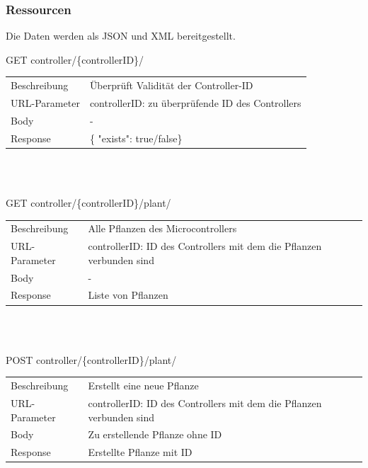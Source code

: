         \subsubsection{Ressourcen}
        Die Daten werden als JSON und XML bereitgestellt.\\
        
        \newcommand{\tabitem}{~~\llap{\textbullet}~~}
     \begin{minipage}{\textwidth}
             GET controller/\{controllerID\}/ 
        
          \begin{tabularx}{\textwidth}{lX}
                \toprule Beschreibung & Überprüft Validität der Controller-ID \\
                URL-Parameter & controllerID: zu überprüfende ID des Controllers \\
                Body & - \\
                Response & \{ "exists": true/false\}
            \end{tabularx}
    \end{minipage}\\\\
        
     \begin{minipage}{\textwidth}
            GET controller/\{controllerID\}/plant/ 

          \begin{tabularx}{\textwidth}{lX}
                \toprule Beschreibung & Alle Pflanzen des Microcontrollers \\
                URL-Parameter & controllerID: ID des Controllers mit dem die Pflanzen verbunden sind \\
                Body & - \\
                Response & Liste von Pflanzen
            \end{tabularx}
    \end{minipage}\\\\
        
     \begin{minipage}{\textwidth}
             POST  controller/\{controllerID\}/plant/ 
         
          \begin{tabularx}{\textwidth}{lX}
             \toprule Beschreibung & Erstellt eine neue Pflanze \\
             URL-Parameter & controllerID: ID des Controllers mit dem die Pflanzen verbunden sind \\
             Body & Zu erstellende Pflanze ohne ID \\
             Response & Erstellte Pflanze mit ID
         \end{tabularx}
    \end{minipage}\\\\
     
